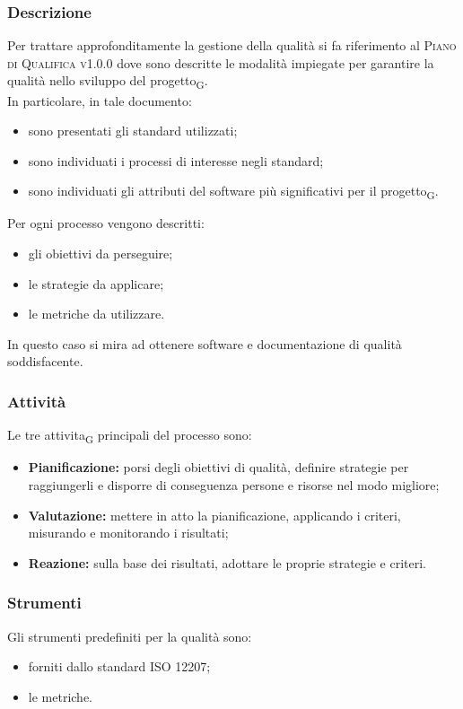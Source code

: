    \subsubsection{Descrizione}
    Per trattare approfonditamente la gestione della qualità si fa riferimento al \textsc{Piano di Qualifica v1.0.0} dove sono descritte le modalità impiegate per garantire la qualità nello sviluppo del progetto\textsubscript{G}.\\In particolare, in tale documento:
    \begin{itemize}
    	\item sono presentati gli standard utilizzati;
    	\item sono individuati i processi di interesse negli standard;
    	\item sono individuati gli attributi del software più significativi per il progetto\textsubscript{G}.
    \end{itemize}
	Per ogni processo vengono descritti:
	\begin{itemize}
		\item gli obiettivi da perseguire;
		\item le strategie da applicare;
		\item le metriche da utilizzare.
	\end{itemize}
	In questo caso si mira ad ottenere software e documentazione di qualità soddisfacente.
    \subsubsection{Attività}
    Le tre attivita\textsubscript{G} principali del processo sono:
    \begin{itemize}
    	\item \textbf{Pianificazione:} porsi degli obiettivi di qualità, definire strategie per raggiungerli e disporre di conseguenza persone e risorse nel modo migliore;
    	\item \textbf{Valutazione:} mettere in atto la pianificazione, applicando i criteri, misurando e monitorando i risultati;
    	\item \textbf{Reazione:} sulla base dei risultati, adottare le proprie strategie e criteri.
    \end{itemize}
	\subsubsection{Strumenti}
	Gli strumenti predefiniti per la qualità sono:
	\begin{itemize}
		\item forniti dallo standard ISO 12207;
		\item le metriche.
	\end{itemize}

